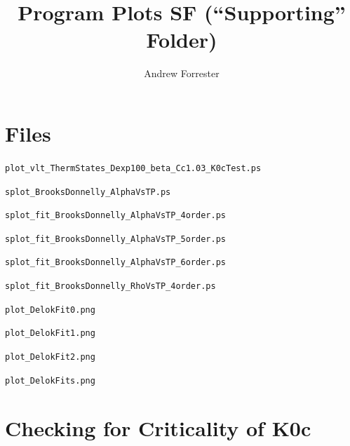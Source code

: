 \documentclass[11pt]{article}
\title{Program Plots SF (``Supporting'' Folder)}
\author{Andrew Forrester}
\begin{document}
\maketitle
\tableofcontents


\section{Files}

\squishlist
  \item \verb|plot_vlt_ThermStates_Dexp100_beta_Cc1.03_K0cTest.ps|
  \item \verb|splot_BrooksDonnelly_AlphaVsTP.ps|
  \item \verb|splot_fit_BrooksDonnelly_AlphaVsTP_4order.ps|
  \item \verb|splot_fit_BrooksDonnelly_AlphaVsTP_5order.ps|
  \item \verb|splot_fit_BrooksDonnelly_AlphaVsTP_6order.ps|
  \item \verb|splot_fit_BrooksDonnelly_RhoVsTP_4order.ps|
  \item \verb|plot_DelokFit0.png|
  \item \verb|plot_DelokFit1.png|
  \item \verb|plot_DelokFit2.png|
  \item \verb|plot_DelokFits.png|
\squishend



\section{Checking for Criticality of K0c}
\end{document}
